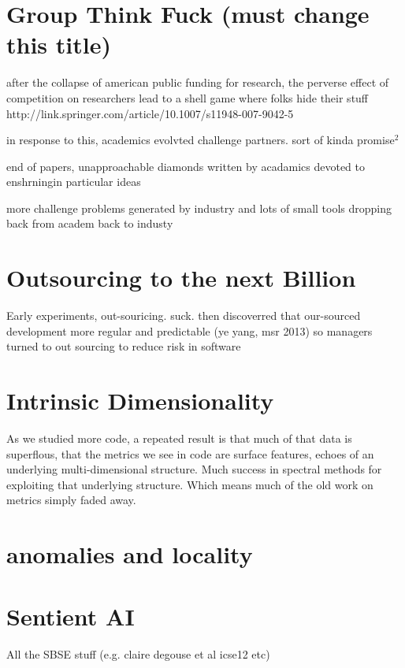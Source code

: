 \documentclass[journal]{IEEEtran}
\begin{document}
\section{Group Think Fuck (must change this title)}

after the collapse of american public funding for research, the
perverse effect of competition on researchers lead to a shell game where folks hide their stuff http://link.springer.com/article/10.1007/s11948-007-9042-5

in response to this, academics evolvted challenge partners.
sort of kinda promise$^2$

end of papers, unapproachable diamonds written by acadamics devoted
to enshrningin particular ideas

more challenge problems generated by industry and lots of small tools dropping
back from academ back to industy



\section{Outsourcing to the next Billion}

Early experiments, out-souricing. suck. then discoverred
that our-sourced development more regular and  predictable (ye yang, msr 2013) so managers turned to out sourcing to reduce risk in
software 

\section{Intrinsic Dimensionality}

As we studied more code, a repeated result is that much of that data is superflous, that the metrics we see in code are surface features, echoes of an underlying multi-dimensional structure. Much success in spectral methods for exploiting that underlying structure. Which means much of the old work on metrics simply faded away.

\section{anomalies and locality}


\section{Sentient AI}

All the SBSE stuff (e.g. claire degouse et al icse12 etc)
\end{document}

